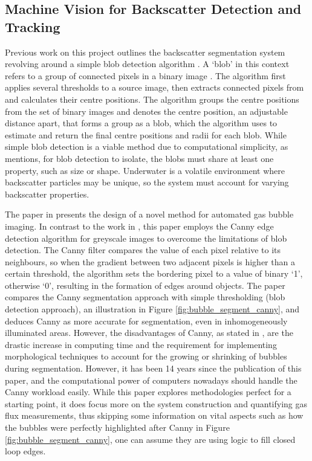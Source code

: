 \subsection{Machine Vision for Backscatter Detection and Tracking}
\label{bi_mv}
Previous work on this project \cite{katieshepherdMachineVisionBased2023} outlines the backscatter segmentation system revolving around a simple blob detection algorithm \cite{opencvOpenCVCvSimpleBlobDetector}. A `blob' in this context refers to a group of connected pixels in a binary image \cite{theodoreWhatExactlyBlob}. The algorithm first applies several thresholds to a source image, then extracts connected pixels from and calculates their centre positions. The algorithm groups the centre positions from the set of binary images and denotes the centre position, an adjustable distance apart, that forms a group as a blob, which the algorithm uses to estimate and return the final centre positions and radii for each blob. While simple blob detection is a viable method due to computational simplicity, as \cite{katieshepherdMachineVisionBased2023} mentions, for blob detection to isolate, the blobs must share at least one property, such as size or shape. Underwater is a volatile environment where backscatter particles may be unique, so the system must account for varying backscatter properties.

The paper in \cite{thomanekAutomatedGasBubble2010} presents the design of a novel method for automated gas bubble imaging. In contrast to the work in \cite{katieshepherdMachineVisionBased2023}, this paper employs the Canny edge detection algorithm \cite{cannyComputationalApproachEdge1986} for greyscale images to overcome the limitations of blob detection. The Canny filter compares the value of each pixel relative to its neighbours, so when the gradient between two adjacent pixels is higher than a certain threshold, the algorithm sets the bordering pixel to a value of binary `1', otherwise `0', resulting in the formation of edges around objects. The paper compares the Canny segmentation approach with simple thresholding (blob detection approach), an illustration in Figure \ref{fig:bubble_segment_canny}, and deduces Canny as more accurate for segmentation, even in inhomogeneously illuminated areas. However, the disadvantages of Canny, as stated in \cite{thomanekAutomatedGasBubble2010}, are the drastic increase in computing time and the requirement for implementing morphological techniques to account for the growing or shrinking of bubbles during segmentation. However, it has been 14 years since the publication of this paper, and the computational power of computers nowadays should handle the Canny workload easily. While this paper explores methodologies perfect for a starting point, it does focus more on the system construction and quantifying gas flux measurements, thus skipping some information on vital aspects such as how the bubbles were perfectly highlighted after Canny in Figure \ref{fig:bubble_segment_canny}, one can assume they are using logic to fill closed loop edges.

